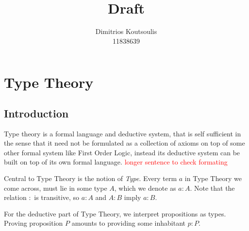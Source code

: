 \documentclass[12pt]{report}
\newcommand\todo[1]{\textcolor{red}{#1}}
\begin{document}
 
\title{Draft}%
\author{Dimitrios Koutsoulis\\ %
11838639} %
 
\begin{titlepage}
\hypersetup{pageanchor=false}
\maketitle
\thispagestyle{empty}
\end{titlepage}
\hypersetup{pageanchor=true}
\chapter{Type Theory}
\section{Introduction}
Type theory is a formal language and deductive system, that is self sufficient in the sense that it need not be formulated as a collection of axioms on top of some other formal system like First Order Logic, instead its deductive system can be built on top of its own formal language. 
\todo{longer sentence to check formating }

Central to Type Theory is the notion of \textit{Type}. Every term $a$ in Type Theory we come across, must lie in some type $A$, which we denote as $a : A$. Note that the relation $:$ is transitive, so $a : A$ and $A : B$ imply $a : B$. 

For the deductive part of Type Theory, we interpret propositions as types. Proving proposition $P$ amounts to providing some inhabitant $p : P$. 
\end{document}
